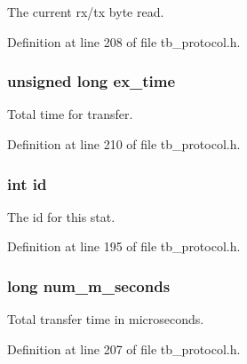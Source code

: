 The current rx/tx byte read. 



Definition at line 208 of file tb\-\_\-protocol.\-h.

\hypertarget{structtb__prot__stats__t_aac25bc0f34fbf812aa9ad386f7a7574f}{
\subsubsection[{ex\-\_\-time}]{\setlength{\rightskip}{0pt plus 5cm}unsigned long ex\-\_\-time}}\label{structtb__prot__stats__t_aac25bc0f34fbf812aa9ad386f7a7574f}


Total time for transfer. 



Definition at line 210 of file tb\-\_\-protocol.\-h.

\hypertarget{structtb__prot__stats__t_a7441ef0865bcb3db9b8064dd7375c1ea}{
\subsubsection[{id}]{\setlength{\rightskip}{0pt plus 5cm}int id}}\label{structtb__prot__stats__t_a7441ef0865bcb3db9b8064dd7375c1ea}


The id for this stat. 



Definition at line 195 of file tb\-\_\-protocol.\-h.

\hypertarget{structtb__prot__stats__t_a6222fdae7552d06b315c06a2d778ff46}{
\subsubsection[{num\-\_\-m\-\_\-seconds}]{\setlength{\rightskip}{0pt plus 5cm}long num\-\_\-m\-\_\-seconds}}\label{structtb__prot__stats__t_a6222fdae7552d06b315c06a2d778ff46}


Total transfer time in microseconds. 



Definition at line 207 of file tb\-\_\-protocol.\-h.

